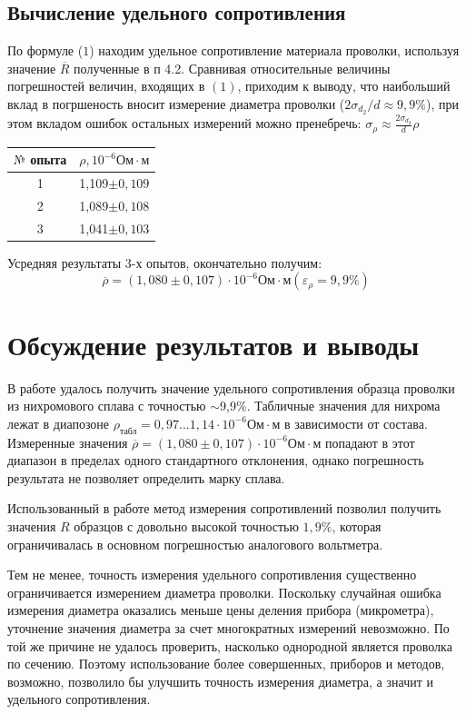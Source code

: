 \documentclass[a4paper,12pt]{article} %
\begin{document}
\subsection{Вычисление удельного сопротивления}
По формуле ($1$) находим удельное сопротивление материала проволки, используя значение $\overline{R}$ полученные в п 4.2. Сравнивая относительные величины погрешностей величин, входящих в $(1)$, приходим к выводу, что наибольший вклад в погршеность вносит измерение диаметра проволки ($2\sigma_{d_2}/d \approx 9,9\%$), при этом вкладом ошибок остальных измерений можно пренебречь: $\sigma_\rho \approx \frac{2\sigma_{d_2}}{d}\rho$

\begin{table}[h]
\centering
\begin{tabular}{|c|c|}
\hline
$\text{№}$ опыта & $\rho, 10^{-6}\text{Ом}\cdot\text{м}$ \\ \hline
1 & 1,109$\pm0,109$\\ \hline
2 & 1,089$\pm0,108$ \\ \hline
3 & 1,041$\pm0,103$ \\ \hline
\end{tabular}
\end{table}
Усредняя результаты 3-х опытов, окончательно получим:
\[\overline{\rho}= (1,080\pm0,107)\cdot10^{-6}\text{Ом}\cdot\text{м}(\varepsilon_\rho = 9,9\%)\]
\section{Обсуждение результатов и выводы}

В работе удалось получить значение удельного сопротивления образца проволки из нихромового сплава с точностью $\sim$9,9$\%$. Табличные значения для нихрома лежат в диапозоне $\rho_{\text{табл}} = 0,97 ... 1,14\cdot10^{-6}\text{Ом}\cdot\text{м}$ в зависимости от состава. Измеренные значения $\overline{\rho}= (1,080\pm0,107)\cdot10^{-6}\text{Ом}\cdot\text{м}$ попадают в этот диапазон в пределах одного стандартного отклонения, однако погрешность результата не позволяет определить марку сплава.

Использованный в работе метод измерения сопротивлений позволил получить значения $R$ образцов с довольно высокой точностью $1,9\%$, которая ограничивалась в основном погрешностью аналогового вольтметра.

Тем не менее, точность измерения удельного сопротивления существенно ограничивается измерением диаметра проволки. Поскольку случайная ошибка измерения диаметра оказались меньше цены деления прибора (микрометра), уточнение значения диаметра за счет многократных измерений невозможно. По той же причине не удалось проверить, насколько однородной является проволка по сечению. Поэтому использование более совершенных, приборов и методов, возможно, позволило бы улучшить точность измерения диаметра, а значит и удельного сопротивления.
\end{document}
